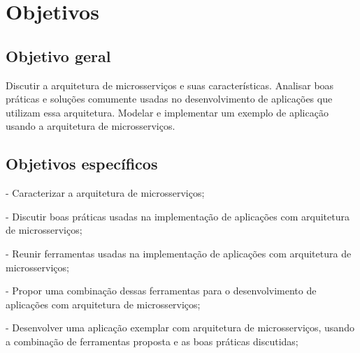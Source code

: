 
\section{Objetivos}\label{sec-objetivos}


\subsection{Objetivo geral}\label{sec-objetivo-geral}

Discutir a arquitetura de microsserviços e suas características. Analisar boas práticas e soluções comumente usadas no desenvolvimento de aplicações que utilizam essa arquitetura. Modelar e implementar um exemplo de aplicação usando a arquitetura de microsserviços.

\subsection{Objetivos específicos}\label{sec-objetivos-especificos}

- Caracterizar a arquitetura de microsserviços;

- Discutir boas práticas usadas na implementação de aplicações com arquitetura de microsserviços;

- Reunir ferramentas usadas na implementação de aplicações com arquitetura de microsserviços;

- Propor uma combinação dessas ferramentas para o desenvolvimento de aplicações com arquitetura de microsserviços;

- Desenvolver uma aplicação exemplar com arquitetura de microsserviços, usando a combinação de ferramentas proposta e as boas práticas discutidas;

